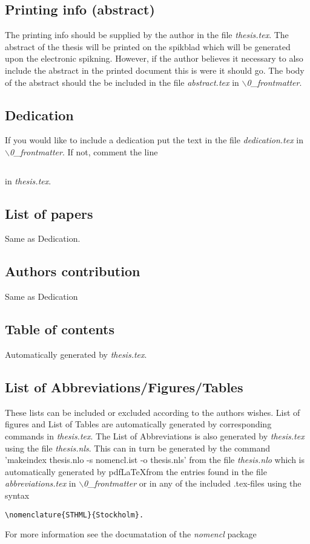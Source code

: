 \subsection{Printing info (abstract)}
The printing info should be supplied by the author in the file \emph{thesis.tex}. The abstract of the thesis will be printed on the spikblad which will be generated upon the electronic spikning. However, if the author believes it necessary to also include the abstract in the printed document this is were it should go. The body of the abstract should the be included in the file \emph{abstract.tex} in \emph{$\backslash$0\_frontmatter}.

\subsection{Dedication}
If you would like to include a dedication put the text in the file \emph{dedication.tex} in \emph{$\backslash$0\_frontmatter}. If not, comment the line 
\begin{verbatim}

\end{verbatim}
in \emph{thesis.tex}.

\subsection{List of papers}
Same as Dedication.

\subsection{Authors contribution}
Same as Dedication

\subsection{Table of contents}
Automatically generated by \emph{thesis.tex}.

\subsection{List of Abbreviations/Figures/Tables}
These lists can be included or excluded according to the authors wishes. List of figures and List of Tables are automatically generated by corresponding commands in \emph{thesis.tex}. The List of Abbreviations is also generated by \emph{thesis.tex} using the file \emph{thesis.nls}. This can in turn be generated by the command 'makeindex thesis.nlo  -s nomencl.ist -o thesis.nls' from the file \emph{thesis.nlo} which is automatically generated by pdf\LaTeX from the entries found in the file \emph{abbreviations.tex} in  \emph{$\backslash$0\_frontmatter} or in any of the included .tex-files using the syntax
\begin{verbatim}
\nomenclature{STHML}{Stockholm}.
\end{verbatim}
 For more information see the documatation of the \emph{nomencl} package \citep{nomencl}

